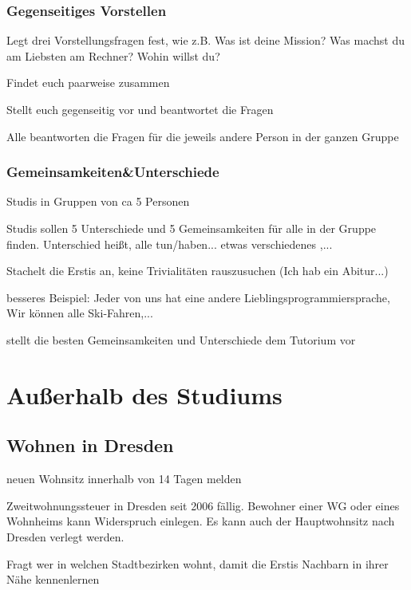 \documentclass[a4paper,12pt]{scrreprt}
\begin{document}
\subsubsection{Gegenseitiges Vorstellen}
\begin{itemize*}
    \item Legt drei Vorstellungsfragen fest, wie z.B. Was ist deine Mission? Was machst du am Liebsten am Rechner? Wohin willst du?
    \item Findet euch paarweise zusammen
    \item Stellt euch gegenseitig vor und beantwortet die Fragen
    \item Alle beantworten die Fragen für die jeweils andere Person in der ganzen Gruppe
\end{itemize*}

\subsubsection{Gemeinsamkeiten\&Unterschiede}
\begin{itemize*}
	\item Studis in Gruppen von ca 5 Personen
	\item Studis sollen 5 Unterschiede und 5 Gemeinsamkeiten für alle in der Gruppe finden. Unterschied heißt, alle tun/haben... etwas verschiedenes ,...
	\item Stachelt die Erstis an, keine Trivialitäten rauszusuchen (Ich hab ein Abitur...)
	\item besseres Beispiel: Jeder von uns hat eine andere Lieblingsprogrammiersprache, Wir können alle Ski-Fahren,...
	\item stellt die besten Gemeinsamkeiten und Unterschiede dem Tutorium vor
\end{itemize*}

\pagebreak

\section{Außerhalb des Studiums}

\subsection{Wohnen in Dresden}
\begin{itemize*}
    \item neuen Wohnsitz innerhalb von 14 Tagen melden
    \item Zweitwohnungssteuer in Dresden seit 2006 fällig. Bewohner einer WG oder eines Wohnheims kann Widerspruch einlegen. Es kann auch der Hauptwohnsitz nach Dresden verlegt werden.
    \item Fragt wer in welchen Stadtbezirken wohnt, damit die Erstis Nachbarn in ihrer Nähe kennenlernen
\end{itemize*}
\end{document}
